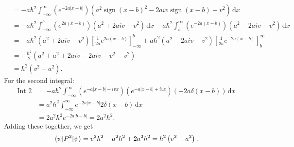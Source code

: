 \documentclass[11pt, letterpaper]{article}
\begin{document}
\begin{enumerate}
\begin{align*}
				     &=-a\hbar ^2\int_{-\infty }^{\infty } \left( e^{-2a|x-b|}  \right) \left( a^2 \operatorname{sign} (x-b)^2-2aiv \operatorname{sign} (x-b)-v^2 \right)  \,\mathrm{d} x\\
				     &=-a\hbar ^2\int_{-\infty }^{b} \left( e^{2a(x-b)}  \right) \left( a^2+2aiv-v^2 \right)  \,\mathrm{d} x-a\hbar ^2\int_{b}^{\infty } \left( e^{-2a(x-b)}  \right) \left( a^2-2aiv-v^2 \right)  \,\mathrm{d} x\\
				     &=-a\hbar^2\left( a^2+2aiv-v^2 \right) \left[ \frac{1}{2a}e^{2a(x-b)}  \right]_{-\infty }^b+a\hbar ^2\left( a^2-2aiv-v^2 \right) \left[\frac{1}{2a}  e^{-2a(x-b)}  \right]_b^{\infty } \\
				     &=-\frac{\hbar ^2}{2} \left( a^2+a^2+2aiv-2aiv-v^2-v^2 \right) \\
				     &=\hbar ^2\left( v^2-a^2 \right) 
		.\end{align*}
		For the second integral:
		\begin{align*}
			\text{Int 2} &=-a\hbar ^2\int_{-\infty }^{\infty } \left( e^{-a|x-b|-ivx}  \right)\left( e^{-a|x-b|+ivx}  \right) \left( -2a\delta (x-b) \right)   \,\mathrm{d} x\\
				     &=a^2\hbar ^2\int_{-\infty }^{\infty } e^{-2a|x-b|} 2\delta (x-b) \,\mathrm{d} x\\
				     &=2a^2\hbar ^2e^{-2a|b-b|} =2a^2\hbar ^2
		.\end{align*}
		Adding these together, we get
		\[
			\langle\psi \rvert P^2\lvert\psi \rangle =v^2\hbar ^2-a^2\hbar ^2+2a^2\hbar ^2=\hbar ^2\left( v^2+a^2 \right) 
		.\]
		

\end{enumerate}
\end{document}
